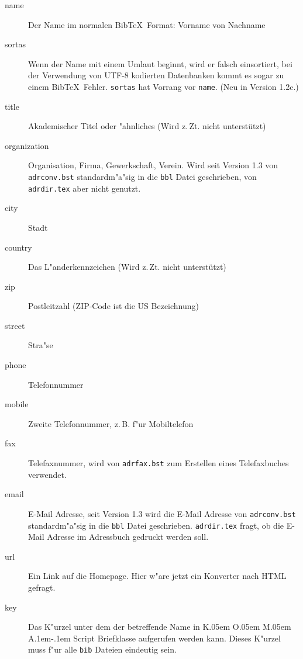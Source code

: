 \documentclass{article}
\newcommand*{\File}[1]{\texttt{#1}}
\DeclareRobustCommand{\KOMAScript}{\textsf{K\kern.05em O\kern.05em%
      M\kern.05em A\kern.1em-\kern.1em Script}}
\begin{document}
\begin{description}
	\item[name]  Der Name im normalen Bib\TeX\ Format: Vorname von 
	Nachname
	
	\item[sortas] Wenn der Name mit einem Umlaut beginnt, wird er falsch
	einsortiert, bei der Verwendung von UTF-8 kodierten Datenbanken kommt
	es sogar zu einem Bib\TeX\ Fehler. \texttt{sortas} hat Vorrang vor
	\texttt{name}. (Neu in Version 1.2c.)

	\item[title] Akademischer Titel oder "ahnliches (Wird z.\,Zt.  
	nicht unterst\"{u}tzt)
	
	\item[organization] Organisation, Firma, Gewerkschaft, Verein.
	  Wird seit Version 1.3 von \File{adrconv.bst} standardm"a"sig in die
	  \texttt{bbl} Datei geschrieben, von \File{adrdir.tex} aber nicht genutzt.
	
	\item[city]  Stadt
	
	\item[country] Das L"anderkennzeichen (Wird z.\,Zt.  nicht 
	unterst\"{u}tzt)

	\item[zip]  Postleitzahl (ZIP-Code ist die US Bezeichnung)

	\item[street]  Stra"se

	\item[phone]  Telefonnummer
	
	\item[mobile] Zweite Telefonnummer, z.\,B. f"ur Mobiltelefon

	\item[fax] Telefaxnummer, wird von \File{adrfax.bst} zum 
	Erstellen eines Telefaxbuches verwendet.
	
	\item[email] E-Mail Adresse, seit Version 1.3 wird die E-Mail Adresse von
      \File{adrconv.bst} standardm"a"sig in die \texttt{bbl} Datei geschrieben.
      \File{adrdir.tex} fragt, ob die E-Mail Adresse im Adressbuch gedruckt werden soll.
	
	\item[url] Ein Link auf die Homepage. Hier w"are jetzt ein Konverter 
	nach HTML gefragt.
	
	\item[key]  Das K"urzel unter dem der betreffende Name in 
	{\KOMAScript} Briefklasse aufgerufen werden kann. Dieses K"urzel muss
	f"ur alle \texttt{bib} Dateien eindeutig sein. 


\end{description}
\end{document}
